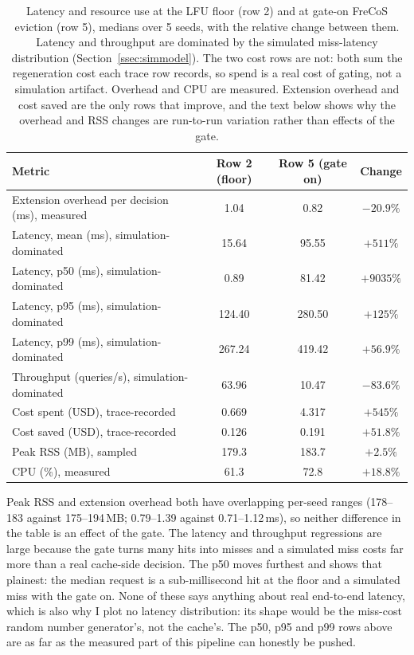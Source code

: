 \documentclass[10pt]{article}
\begin{document}
\begin{table}[H]
\centering
\caption{Latency and resource use at the LFU floor (row 2) and at gate-on FreCoS eviction
(row 5), medians over 5 seeds, with the relative change between them. Latency and throughput
are dominated by the simulated miss-latency distribution (Section~\ref{ssec:simmodel}). The
two cost rows are not: both sum the regeneration cost each trace row records, so spend is a
real cost of gating, not a simulation artifact. Overhead and CPU are measured. Extension
overhead and cost saved are the only rows that improve, and the text below shows why the
overhead and RSS changes are run-to-run variation rather than effects of the gate.}
\label{tab:latency}
\small
\begin{tabular}{lccc}
\toprule
Metric & Row 2 (floor) & Row 5 (gate on) & Change \\
\midrule
Extension overhead per decision (ms), measured & 1.04 & 0.82 & $-20.9\%$ \\
Latency, mean (ms), simulation-dominated & 15.64 & 95.55 & $+511\%$ \\
Latency, p50 (ms), simulation-dominated & 0.89 & 81.42 & $+9035\%$ \\
Latency, p95 (ms), simulation-dominated & 124.40 & 280.50 & $+125\%$ \\
Latency, p99 (ms), simulation-dominated & 267.24 & 419.42 & $+56.9\%$ \\
Throughput (queries/s), simulation-dominated & 63.96 & 10.47 & $-83.6\%$ \\
Cost spent (USD), trace-recorded & 0.669 & 4.317 & $+545\%$ \\
Cost saved (USD), trace-recorded & 0.126 & 0.191 & $+51.8\%$ \\
Peak RSS (MB), sampled & 179.3 & 183.7 & $+2.5\%$ \\
CPU (\%), measured & 61.3 & 72.8 & $+18.8\%$ \\
\bottomrule
\end{tabular}
\end{table}

Peak RSS and extension overhead both have overlapping per-seed ranges (178--183 against
175--194\,MB; 0.79--1.39 against 0.71--1.12\,ms), so neither difference in the table is an
effect of the gate. The latency and throughput regressions are large because the gate turns
many hits into misses and a simulated miss costs far more than a real cache-side decision. The
p50 moves furthest and shows that plainest: the median request is a sub-millisecond hit at the
floor and a simulated miss with the gate on. None of these says anything about real end-to-end
latency, which is also why I plot no latency distribution: its shape would be the miss-cost
random number generator's, not the cache's. The p50, p95 and p99 rows above are as far as the
measured part of this pipeline can honestly be pushed.
\end{document}

